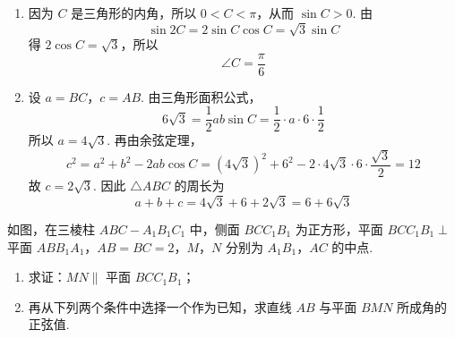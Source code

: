 \begin{solution}
\begin{enumerate}
\item 因为 \(C\) 是三角形的内角，所以 \(0<C<\pi\)，从而 \(\sin C>0\). 由
\[
\sin 2C=2\sin C\cos C=\sqrt3\sin C
\]
得 \(2\cos C=\sqrt3\)，所以
\[
\angle C=\dfrac{\pi}{6}
\]

\item 设 \(a=BC\)，\(c=AB\). 由三角形面积公式，
\[
6\sqrt3=\dfrac12ab\sin C=\dfrac12\cdot a\cdot6\cdot\dfrac12
\]
所以 \(a=4\sqrt3\). 再由余弦定理，
\[
c^2=a^2+b^2-2ab\cos C
=(4\sqrt3)^2+6^2-2\cdot4\sqrt3\cdot6\cdot\dfrac{\sqrt3}{2}=12
\]
故 \(c=2\sqrt3\). 因此 \(\triangle ABC\) 的周长为
\[
a+b+c=4\sqrt3+6+2\sqrt3=6+6\sqrt3
\]
\end{enumerate}
\end{solution}

\begin{problem}
如图，在三棱柱 \(ABC-A_1B_1C_1\) 中，侧面 \(BCC_1B_1\) 为正方形，平面 \(BCC_1B_1\perp\) 平面 \(ABB_1A_1\)，\(AB=BC=2\)，\(M\)，\(N\) 分别为 \(A_1B_1\)，\(AC\) 的中点.



\begin{enumerate}
\item 求证：\(MN\parallel\) 平面 \(BCC_1B_1\)；

\item 再从下列两个条件中选择一个作为已知，求直线 \(AB\) 与平面 \(BMN\) 所成角的正弦值.


\end{enumerate}

\end{problem}

